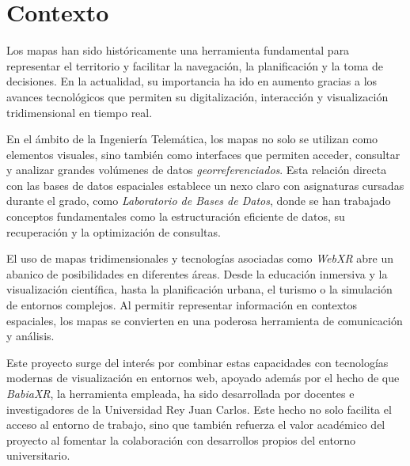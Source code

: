 \documentclass[a4paper, 12pt]{book}
\begin{document}


\section{Contexto}
\label{sec:contexto}

Los mapas han sido históricamente una herramienta fundamental para representar el territorio y facilitar la navegación, la planificación y la toma de decisiones. En la actualidad, su importancia ha ido en aumento gracias a los avances tecnológicos que permiten su digitalización, interacción y visualización tridimensional en tiempo real.

En el ámbito de la Ingeniería Telemática, los mapas no solo se utilizan como elementos visuales, sino también como interfaces que permiten acceder, consultar y analizar grandes volúmenes de datos \textit{georreferenciados}. Esta relación directa con las bases de datos espaciales establece un nexo claro con asignaturas cursadas durante el grado, como \textit{ Laboratorio de Bases de Datos}, donde se han trabajado conceptos fundamentales como la estructuración eficiente de datos, su recuperación y la optimización de consultas.

El uso de mapas tridimensionales y tecnologías asociadas como \textit{WebXR} abre un abanico de posibilidades en diferentes áreas. Desde la educación inmersiva y la visualización científica, hasta la planificación urbana, el turismo o la simulación de entornos complejos. Al permitir representar información en contextos espaciales, los mapas se convierten en una poderosa herramienta de comunicación y análisis.

Este proyecto surge del interés por combinar estas capacidades con tecnologías modernas de visualización en entornos web, apoyado además por el hecho de que \textit{BabiaXR}, la herramienta empleada, ha sido desarrollada por docentes e investigadores de la Universidad Rey Juan Carlos. Este hecho no solo facilita el acceso al entorno de trabajo, sino que también refuerza el valor académico del proyecto al fomentar la colaboración con desarrollos propios del entorno universitario.


\end{document}

